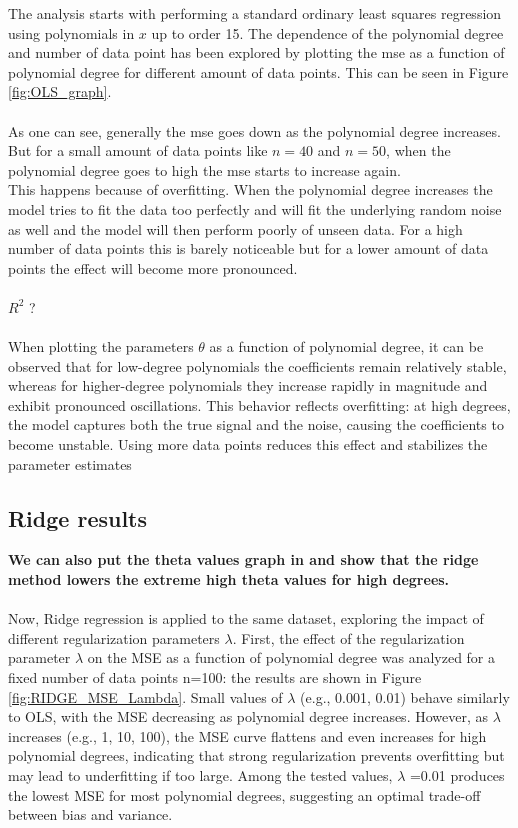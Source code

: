 \documentclass[%
 reprint,            %
 amsmath,amssymb,
 aps,
]{revtex4-2}
\begin{document}
The analysis starts with performing a standard ordinary least squares regression using polynomials in $x$ up to order 15. The dependence of the polynomial degree and number of data point has been explored by plotting the mse as a function of polynomial degree for different amount of data points. This can be seen in Figure \ref{fig:OLS_graph}.\\\\
As one can see, generally the mse goes down as the polynomial degree increases. But for a small amount of data points like $n = 40$ and $n = 50$, when the polynomial degree goes to high the mse starts to increase again.\\
This happens because of overfitting. When the polynomial degree increases the model tries to fit the data too perfectly and will fit the underlying random noise as well and the model will then perform poorly of unseen data. For a high number of data points this is barely noticeable but for a lower amount of data points the effect will become more pronounced.\\\\
$R^2$ ?\\\\
When plotting the parameters $\theta$ as a function of polynomial degree, it can be observed that for low-degree polynomials the coefficients remain relatively stable, whereas for higher-degree polynomials they increase rapidly in magnitude and exhibit pronounced oscillations.
This behavior reflects overfitting: at high degrees, the model captures both the true signal and the noise, causing the coefficients to become unstable. Using more data points reduces this effect and stabilizes the parameter estimates
    


\subsection{Ridge results}
\textbf{We can also put the theta values graph in and show that the ridge method lowers the extreme high theta values for high degrees.}\\\\
Now, Ridge regression is applied to the same dataset, exploring the impact of different regularization parameters $\lambda$. First, the effect of the regularization parameter $\lambda $ on the MSE as a function of polynomial degree was analyzed for a fixed number of data points n=100: the results are shown in Figure \ref{fig:RIDGE_MSE_Lambda}.
Small values of $\lambda$ (e.g., 0.001, 0.01) behave similarly to OLS, with the MSE decreasing as polynomial degree increases. However, as $\lambda$ increases (e.g., 1, 10, 100), the MSE curve flattens and even increases for high polynomial degrees, indicating that strong regularization prevents overfitting but may lead to underfitting if too large.
Among the tested values, $\lambda$ =0.01 produces the lowest MSE for most polynomial degrees, suggesting an optimal trade-off between bias and variance.
\end{document}
